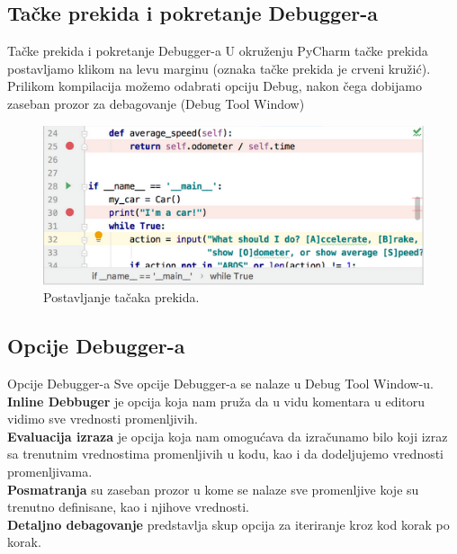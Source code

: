 \documentclass{beamer}
\begin{document}
\subsection{Tačke prekida i pokretanje Debugger-a}
\begin{frame}{Tačke prekida i pokretanje Debugger-a}
U okruženju PyCharm tačke prekida postavljamo klikom na levu marginu (oznaka tačke prekida je crveni kružić).\\
Prilikom kompilacija možemo odabrati opciju Debug, nakon čega dobijamo zaseban prozor za debagovanje (Debug Tool Window)
\begin{figure}[h!]
\begin{center}
\includegraphics[scale = 0.4]{1}
\end{center}
\caption{Postavljanje tačaka prekida.}
\label{1}
\end{figure}
    
\end{frame}
\subsection{Opcije Debugger-a}
\begin{frame}{Opcije Debugger-a}
Sve opcije Debugger-a se nalaze u Debug Tool Window-u.\\
\textbf{Inline Debbuger} je opcija koja nam pruža da u vidu komentara u editoru vidimo sve vrednosti promenljivih.\\
\textbf{Evaluacija izraza} je opcija koja nam omogućava da izračunamo bilo koji izraz sa trenutnim vrednostima promenljivih u kodu, kao i da dodeljujemo vrednosti promenljivama.\\
\textbf{Posmatranja} su zaseban prozor u kome se nalaze sve promenljive koje su trenutno definisane, kao i njihove vrednosti.\\
\textbf{Detaljno debagovanje} predstavlja skup opcija za iteriranje kroz kod korak po korak.
\end{frame}
\end{document}
